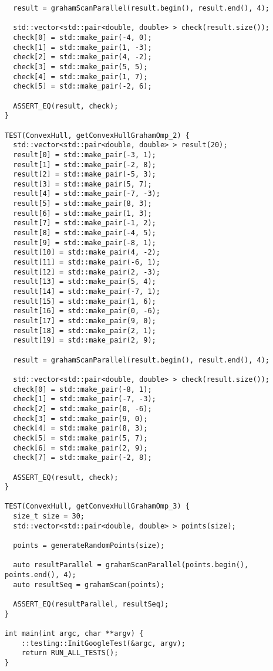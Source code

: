 \documentclass{report}
\begin{document}
\begin{lstlisting}
  result = grahamScanParallel(result.begin(), result.end(), 4);

  std::vector<std::pair<double, double> > check(result.size());
  check[0] = std::make_pair(-4, 0);
  check[1] = std::make_pair(1, -3);
  check[2] = std::make_pair(4, -2);
  check[3] = std::make_pair(5, 5);
  check[4] = std::make_pair(1, 7);
  check[5] = std::make_pair(-2, 6);

  ASSERT_EQ(result, check);
}

TEST(ConvexHull, getConvexHullGrahamOmp_2) {
  std::vector<std::pair<double, double> > result(20);
  result[0] = std::make_pair(-3, 1);
  result[1] = std::make_pair(-2, 8);
  result[2] = std::make_pair(-5, 3);
  result[3] = std::make_pair(5, 7);
  result[4] = std::make_pair(-7, -3);
  result[5] = std::make_pair(8, 3);
  result[6] = std::make_pair(1, 3);
  result[7] = std::make_pair(-1, 2);
  result[8] = std::make_pair(-4, 5);
  result[9] = std::make_pair(-8, 1);
  result[10] = std::make_pair(4, -2);
  result[11] = std::make_pair(-6, 1);
  result[12] = std::make_pair(2, -3);
  result[13] = std::make_pair(5, 4);
  result[14] = std::make_pair(-7, 1);
  result[15] = std::make_pair(1, 6);
  result[16] = std::make_pair(0, -6);
  result[17] = std::make_pair(9, 0);
  result[18] = std::make_pair(2, 1);
  result[19] = std::make_pair(2, 9);

  result = grahamScanParallel(result.begin(), result.end(), 4);

  std::vector<std::pair<double, double> > check(result.size());
  check[0] = std::make_pair(-8, 1);
  check[1] = std::make_pair(-7, -3);
  check[2] = std::make_pair(0, -6);
  check[3] = std::make_pair(9, 0);
  check[4] = std::make_pair(8, 3);
  check[5] = std::make_pair(5, 7);
  check[6] = std::make_pair(2, 9);
  check[7] = std::make_pair(-2, 8);

  ASSERT_EQ(result, check);
}

TEST(ConvexHull, getConvexHullGrahamOmp_3) {
  size_t size = 30;
  std::vector<std::pair<double, double> > points(size);

  points = generateRandomPoints(size);

  auto resultParallel = grahamScanParallel(points.begin(), points.end(), 4);
  auto resultSeq = grahamScan(points);

  ASSERT_EQ(resultParallel, resultSeq);
}

int main(int argc, char **argv) {
    ::testing::InitGoogleTest(&argc, argv);
    return RUN_ALL_TESTS();
}
\end{lstlisting}
\end{document}
